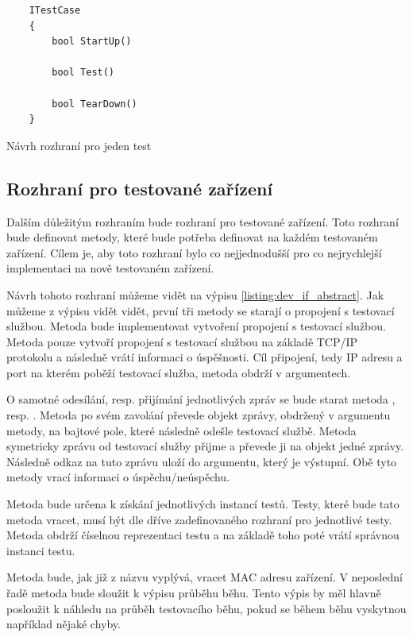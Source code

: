 \begin{listing}[htbp]
    \begin{verbatim}
    ITestCase 
    {
        bool StartUp()

        bool Test()

        bool TearDown()
    }
    \end{verbatim}
\caption{Návrh rozhraní pro jeden test}
\label{listing:test_if}
\end{listing}



\subsection{Rozhraní pro testované zařízení}

Dalším důležitým rozhraním bude rozhraní pro testované zařízení. Toto rozhraní bude definovat metody, které bude potřeba definovat na každém testovaném zařízení. Cílem je, aby toto rozhraní bylo co nejjednodušší pro co nejrychlejší implementaci na nově testovaném zařízení.

Návrh tohoto rozhraní můžeme vidět na výpisu \ref{listing:dev_if_abstract}. Jak můžeme z výpisu vidět vidět, první tři metody se starají o propojení s testovací službou. Metoda  bude implementovat vytvoření propojení s testovací službou. Metoda pouze vytvoří propojení s testovací službou na základě TCP/IP protokolu a následně vrátí informaci o úspěšnosti. Cíl připojení, tedy IP adresu a port na kterém poběží testovací služba, metoda obdrží v argumentech.

O samotné odesílání, resp. přijímání jednotlivých zpráv se bude starat metoda , resp. . Metoda  po svém zavolání převede objekt zprávy, obdržený v argumentu metody, na bajtové pole, které následně odešle testovací službě. Metoda  symetricky zprávu od testovací služby přijme a převede ji na objekt jedné zprávy. Následně odkaz na tuto zprávu uloží do argumentu, který je výstupní. Obě tyto metody vrací informaci o úspěchu/neúspěchu.

Metoda  bude určena k získání jednotlivých instancí testů. Testy, které bude tato metoda vracet, musí být dle dříve zadefinovaného rozhraní pro jednotlivé testy. Metoda obdrží číselnou reprezentaci testu a na základě toho poté vrátí správnou instanci testu. 

Metoda  bude, jak již z názvu vyplývá, vracet MAC adresu zařízení. V neposlední řadě metoda  bude sloužit k výpisu průběhu běhu. Tento výpis by měl hlavně posloužit k náhledu na průběh testovacího běhu, pokud se během běhu vyskytnou například nějaké chyby.

